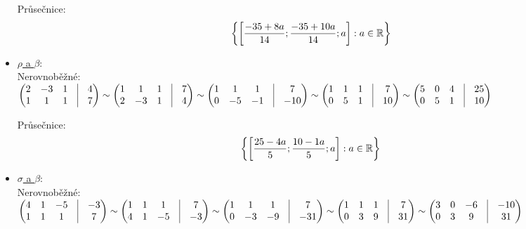 \begin{itemize}
		Průsečnice:
		 $$
			  \left\{{\left[{\frac{-35+8 a}{14}; \frac{-35+10 a}{14}; a}\right]:a \in \mathbb{R}}\right\}
		 $$
	\item \underline{$\rho$ a $\beta$}: \\
		Nerovnoběžné:\\
		 $ \begin{pmatrix}
			 2 &-3 &1 &\vline& 4 \\ 
			 1 &1 &1 &\vline& 7 \\ 
		 \end{pmatrix}
		 \sim
		 \begin{pmatrix}
			 1 &1 &1 &\vline& 7 \\ 
			 2 &-3 &1 &\vline& 4 \\ 
		 \end{pmatrix}
		 \sim
		 \begin{pmatrix}
			 1 &1 &1 &\vline& 7 \\ 
			 0 &-5 &-1 &\vline& -10 \\ 
		 \end{pmatrix}
		 \sim
		 \begin{pmatrix}
			 1 &1 &1 &\vline& 7 \\ 
			 0 &5 &1 &\vline& 10 \\ 
		 \end{pmatrix}
		 \sim
		 \begin{pmatrix}
			 5 &0 &4 &\vline& 25 \\ 
			 0 &5 &1 &\vline& 10 \\ 
		 \end{pmatrix}
		 $


		Průsečnice:
		 $$ 
		 \left\{{\left[{\frac{25-4 a}{5}; \frac{10-1 a}{5}; a}\right]:a \in \mathbb{R}}\right\} 
		   $$ 
	\item \underline{$\sigma$ a $\beta$}: \\
		Nerovnoběžné:\\
		 $ \begin{pmatrix}
			 4 &1 &-5 &\vline& -3 \\ 
			 1 &1 &1 &\vline& 7 \\ 
		 \end{pmatrix}
		 \sim
		 \begin{pmatrix}
			 1 &1 &1 &\vline& 7 \\ 
			 4 &1 &-5 &\vline& -3 \\ 
		 \end{pmatrix}
		 \sim
		 \begin{pmatrix}
			 1 &1 &1 &\vline& 7 \\ 
			 0 &-3 &-9 &\vline& -31 \\ 
		 \end{pmatrix}
		 \sim
		 \begin{pmatrix}
			 1 &1 &1 &\vline& 7 \\ 
			 0 &3 &9 &\vline& 31 \\ 
		 \end{pmatrix}
		 \sim
		 \begin{pmatrix}
			 3 &0 &-6 &\vline& -10 \\ 
			 0 &3 &9 &\vline& 31 \\ 
		 \end{pmatrix}
		 $



\end{itemize}
